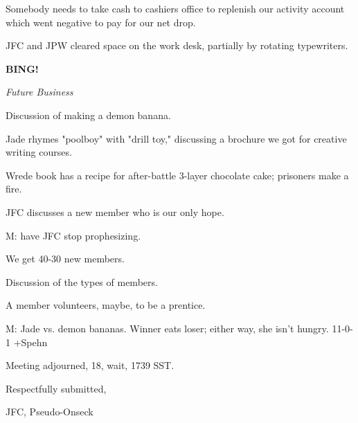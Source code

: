 \documentclass[12pt]{article}
\newcommand{\bing}{{\bf BING!} }
\newcommand{\goto}[1]{\bing \vskip 12pt \centerline{{\em{#1}}}}
\begin{document}
Somebody needs to take cash to cashiers office to replenish our activity account which went negative to pay for our net drop.

JFC and JPW cleared space on the work desk, partially by rotating typewriters.

\goto{Future Business}

Discussion of making a demon banana.

Jade rhymes "poolboy" with "drill toy," discussing a brochure we got for creative writing courses.

Wrede book has a recipe for after-battle 3-layer chocolate cake; prisoners make a fire.

JFC discusses a new member who is our only hope.

M: have JFC stop prophesizing.

We get 40-30 new members.

Discussion of the types of members.

A member volunteers, maybe, to be a prentice.

M: Jade vs. demon bananas. Winner eats loser; either way, she isn't hungry. 11-0-1 +Spehn

\vspace{12pt}

\noindent
Meeting adjourned, 18, wait, 1739 SST.

\vspace{18pt}

\centerline{Respectfully submitted,}
\centerline{JFC, Pseudo-Onseck}
\end{document}
